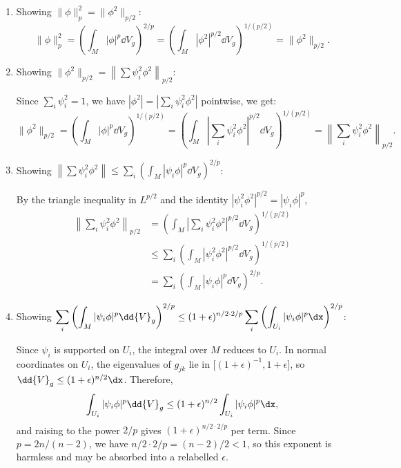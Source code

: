 \begin{computational-work}\leavevmode
  \label{cw:aubin}

  \begin{enumerate}
    \item Showing $\|\phi\|_p^2 = \|\phi^2\|_{p/2}$:
      \[%
        \|\phi\|_p^2 = \left(\int_M |\phi|^p \dd{V}_g\right)^{2/p} = \left(\int_M |\phi^2|^{p/2} \dd{V}_g\right)^{1/(p/2)} = \|\phi^2\|_{p/2}
      .\]%

    \item Showing $\|\phi^2\|_{p/2} = \left\lVert\sum \psi_i^2 \phi^2\right\rVert_{p/2}$:

      Since $\sum_i \psi_i^2 = 1$, we have $|\phi^2| = |\sum_i \psi_i^2 \phi^2|$ pointwise, we get:
      \[%
        \|\phi^2\|_{p/2} = \left(\int_M |\phi|^p \dd{V}_g\right)^{1/(p/2)} = \left(\int_M \left|\sum_i \psi_i^2 \phi^2\right|^{p/2} \dd{V}_g\right)^{1/(p/2)} = \left\lVert\sum_i \psi_i^2 \phi^2\right\rVert_{p/2}
      .\]%

    \item Showing $\left\lVert \sum \psi_i^2 \phi^2\right\rVert \le \sum_i \left(\int_M |\psi_i \phi|^p \dd{V}_g\right)^{2/p}$:

      By the triangle inequality in $L^{p/2}$ and the identity $|\psi_i^2\phi^2|^{p/2} = |\psi_i\phi|^p$,
      \begin{align*}
        \left\lVert\sum_i \psi_i^2 \phi^2\right\rVert_{p/2} &= \left(\int_M \left|\sum_i \psi_i^2 \phi^2\right|^{p/2} \dd{V}_g\right)^{1/(p/2)} \\
                                                            &\le \sum_i \left(\int_M |\psi_i^2 \phi^2|^{p/2} \dd{V}_g\right)^{1/(p/2)} \\
                                                            &= \sum_i \left(\int_M |\psi_i \phi|^p \dd{V}_g\right)^{2/p}
      .\end{align*}

    \item Showing $\displaystyle\sum_i \left(\int_M |\psi_i\phi|^p\dd{V}_g\right)^{2/p} \le (1+\epsilon)^{n/2 \cdot 2/p} \sum_i \left(\int_{U_i} |\psi_i\phi|^p\dx\right)^{2/p}$:

      Since $\psi_i$ is supported on $U_i$, the integral over $M$ reduces to $U_i$. In normal coordinates on $U_i$, the eigenvalues of $g_{jk}$ lie in $\bigl[(1+\epsilon)^{-1},  1+\epsilon\bigr]$, so $\dd{V}_g \le (1+\epsilon)^{n/2}\dx$. Therefore,
      \[%
        \int_{U_i} |\psi_i\phi|^p \dd{V}_g \le (1+\epsilon)^{n/2} \int_{U_i} |\psi_i\phi|^p \dx
      ,\]%
      and raising to the power $2/p$ gives $(1+\epsilon)^{n/2 \cdot 2/p}$ per term. Since $p = 2n/(n-2)$, we have $n/2 \cdot 2/p = (n-2)/2 < 1$, so this exponent is harmless and may be absorbed into a relabelled $\epsilon$.


\end{enumerate}
\end{computational-work}
